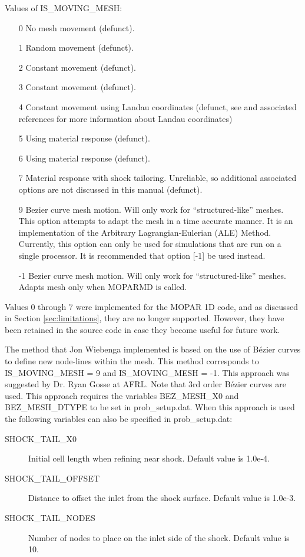 \documentclass[]{article}
\begin{document}
\noindent Values of IS\_MOVING\_MESH:
\begin{enumerate}
 \item [0] No mesh movement (defunct).
 \item [1] Random movement (defunct).
 \item [2] Constant movement (defunct).
 \item [3] Constant movement (defunct).
 \item [4] Constant movement using Landau coordinates (defunct, see \cite{alex} and associated references for more information about Landau coordinates)
 \item [5] Using material response (defunct).
 \item [6] Using material response (defunct).
 \item [7] Material response with shock tailoring.  Unreliable, so additional associated options are not discussed in this manual (defunct).
 \item [9] Bezier curve mesh motion.  Will only work for ``structured-like'' meshes.  This option attempts to adapt the mesh in a time accurate manner.  It is an implementation of the Arbitrary Lagrangian-Eulerian (ALE) Method.  Currently, this option can only be used for simulations that are run on a single processor.  It is recommended that option [-1] be used instead.
 \item [-1] Bezier curve mesh motion.  Will only work for ``structured-like'' meshes.  Adapts mesh only when MOPARMD is called.
\end{enumerate}

Values 0 through 7 were implemented for the MOPAR 1D code, and as discussed in Section \ref{sec:limitations}, they are no longer supported.  However, they have been retained in the source code in case they become useful for future work.

The method that Jon Wiebenga implemented is based on the use of B\'{e}zier curves to define new node-lines within the mesh. This method corresponds to IS\_MOVING\_MESH = 9 and IS\_MOVING\_MESH = -1.  This approach was suggested by Dr. Ryan Gosse at AFRL.  Note that 3rd order B\'{e}zier curves are used.  This approach requires the variables BEZ\_MESH\_X0 and BEZ\_MESH\_DTYPE to be set in prob\_setup.dat.  When this approach is used the following variables can also be specified in prob\_setup.dat:

\begin{description}
\item[SHOCK\_TAIL\_X0] Initial cell length when refining near shock.  Default value is  1.0e-4.
\item[SHOCK\_TAIL\_OFFSET] Distance to offset the inlet from the shock surface.  Default value is 1.0e-3.
\item[SHOCK\_TAIL\_NODES] Number of nodes to place on the inlet side of the shock. Default value is 10.
\end{description}
\end{document}
